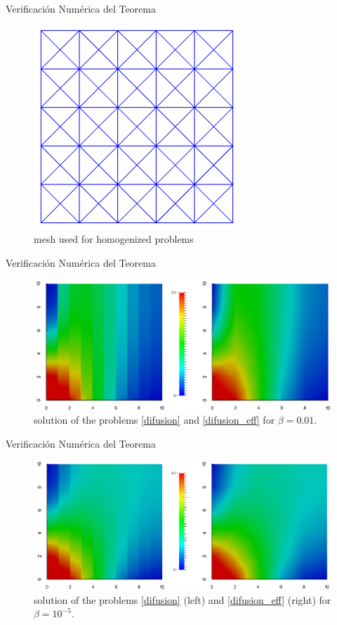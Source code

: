 \documentclass[11pt,spanish]{beamer}
\begin{document}
\begin{frame}{Verificación Numérica del Teorema}
\begin{figure}[H]
\centering
\includegraphics[height = 4 cm]{fig/theorem_verification_r1-malla_gruesa}
\caption{mesh used for homogenized problems}\label{fig:verification-malla_gruesa}
\end{figure}
\end{frame}

\begin{frame}{Verificación Numérica del Teorema}
\begin{figure}[H]
\centering
\includegraphics[height = 4 cm]{fig/theorem_verification_r1-beta001}
\caption{solution of the problems \ref{difusion} and \ref{difusion_eff} for $\beta = 0.01$.} 
\end{figure}
\end{frame}

\begin{frame}{Verificación Numérica del Teorema}
\begin{figure}[H]
\centering
\includegraphics[height = 4 cm]{fig/theorem_verification_r1-beta10_-5}
\caption{solution of the problems \ref{difusion} (left) and \ref{difusion_eff} (right) for $\beta = 10^{-5}$.} 
\end{figure}
\end{frame}
\end{document}
